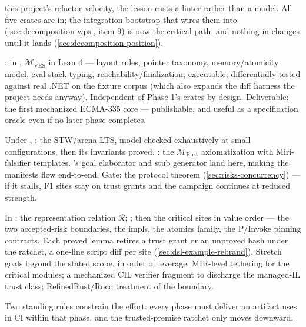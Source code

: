 \begin{description}
  this project's refactor velocity, the lesson costs a linter rather
  than a model. All five crates are in; the integration bootstrap that
  wires them into \dotnetrs{} (\cref{sec:decomposition-wps}, item 9) is
  now the critical path, and nothing in \dotnetrs{} changes until it
  lands (\cref{sec:decomposition-position}).
\item[Phase 2 --- The model (3--6 months).] :
  in ,
  $\mathcal{M}_{\mathrm{VES}}$ in Lean 4 --- layout rules, pointer
  taxonomy, memory/atomicity model, eval-stack typing,
  reachability/finalization; executable; differentially tested against
  real .NET on the fixture corpus (which also expands the diff harness
  the project needs anyway). Independent of Phase 1's crates by
  design. Deliverable: the first mechanized ECMA-335 core ---
  publishable, and useful as a specification oracle even if no later
  phase completes.
\item[Phase 3 --- The two hard theories (2--4 months, parallelizable).]
  Under , : the
  STW/arena LTS, model-checked exhaustively at
  small configurations, then its invariants proved.
  : the $\mathcal{M}_{\mathrm{Rust}}$
  axiomatization with Miri-falsifier templates. 's goal
  elaborator and stub generator land here, making the manifests flow
  end-to-end. Gate: the protocol theorem
  (\cref{sec:risks-concurrency}) --- if it stalls, F1 sites stay on
  trust grants and the campaign continues at reduced strength.
\item[Phase 4 --- The campaign (3--6 months, then open-ended).]
  In : the
  representation relation $\mathcal{R}$;
  ; then the critical sites in value order --- the two
  accepted-risk boundaries, the  impls, the atomics
  family, the P/Invoke pinning contracts. Each proved lemma retires a
  trust grant or an unproved hash under the ratchet, a one-line script
  diff per site (\cref{sec:dsl-example-rebrand}). Stretch goals beyond
  the stated scope, in order of leverage: MIR-level tethering for the
  critical modules; a mechanized CIL verifier fragment to discharge the
  managed-IL trust class; RefinedRust/Rocq treatment of the \gcarena{}
  boundary.
\end{description}

Two standing rules constrain the effort: every phase must deliver an
artifact \dotnetrs{} uses in CI within that phase, and the
trusted-premise ratchet only moves downward.
